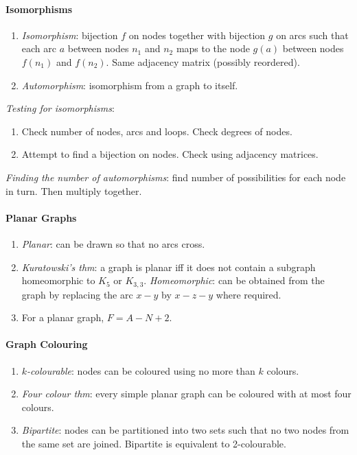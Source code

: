 \documentclass[twocolumn,english]{article}
\begin{document}
\paragraph{Isomorphisms}
\begin{enumerate}
\item \emph{Isomorphism}: bijection $f$ on nodes together with bijection
$g$ on arcs such that each arc $a$ between nodes $n_{1}$ and $n_{2}$
maps to the node $g\left(a\right)$ between nodes $f\left(n_{1}\right)$
and $f\left(n_{2}\right)$. Same adjacency matrix (possibly reordered).
\item \emph{Automorphism}: isomorphism from a graph to itself.
\end{enumerate}
\emph{Testing for isomorphisms}:
\begin{enumerate}
\item Check number of nodes, arcs and loops. Check degrees of nodes.
\item Attempt to find a bijection on nodes. Check using adjacency matrices.
\end{enumerate}
\emph{Finding the number of automorphisms}: find number of possibilities
for each node in turn. Then multiply together.


\paragraph{Planar Graphs}
\begin{enumerate}
\item \emph{Planar}: can be drawn so that no arcs cross.
\item \emph{Kuratowski's thm}: a graph is planar iff it does not contain
a subgraph homeomorphic to $K_{5}$ or $K_{3,3}$.\emph{ Homeomorphic}:
can be obtained from the graph by replacing the arc $x-y$ by $x-z-y$
where required.
\item For a planar graph, $F=A-N+2$.
\end{enumerate}

\paragraph{Graph Colouring}
\begin{enumerate}
\item \emph{$k$-colourable}: nodes can be coloured using no more than $k$
colours.
\item \emph{Four colour thm}: every simple planar graph can be coloured
with at most four colours.
\item \emph{Bipartite}: nodes can be partitioned into two sets such that
no two nodes from the same set are joined. Bipartite is equivalent
to 2-colourable.
\end{enumerate}
\end{document}
